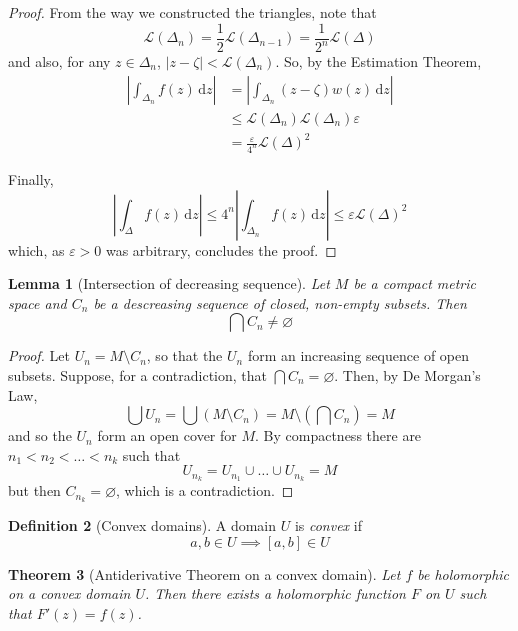 \documentclass[10pt,fleqn]{article}
\newcommand{\diff}{\,\mathrm{d}}
\newcommand{\eps}{\varepsilon}
\theoremstyle{definition} \newtheorem{defn}{Definition}[section]
\theoremstyle{plain}      \newtheorem{thm}[defn]{Theorem}
\theoremstyle{definition} \newtheorem{prop}[defn]{Proposition}
\theoremstyle{plain}      \newtheorem{lem}[defn]{Lemma}
\theoremstyle{definition} \newtheorem{cor}[defn]{Corollary}
\theoremstyle{definition} \newtheorem{ex}[defn]{Example}
\theoremstyle{definition} \newtheorem{rem}[defn]{Remark}
\begin{document}
\begin{proof}
    From the way we constructed the triangles, note that
    \[
        \mathcal{L}(\Delta_n)=
        \frac{1}{2}\mathcal{L}(\Delta_{n-1})=
        \frac{1}{2^n}\mathcal{L}(\Delta)
    \]
    and also, for any $z\in\Delta_n$, $|z-\zeta|<\mathcal{L}(\Delta_n)$.
    So, by the Estimation Theorem,
    \begin{align*}
        \left|\int_{\Delta_n} f(z)\diff z\right|
        &=
        \left|\int_{\Delta_n} (z-\zeta)w(z)\diff z \right|\\
        &\leq
        \mathcal{L}(\Delta_n)\mathcal{L}(\Delta_n)\eps\\
        &=
        \frac{\eps}{4^n}\mathcal{L}(\Delta)^2
    \end{align*}

    Finally,
    \[
        \left|\int_{\Delta} f(z)\diff z\right|\leq
        4^n\left|\int_{\Delta_n} f(z)\diff z\right|\leq
        \eps\mathcal{L}(\Delta)^2
    \]
    which, as $\eps>0$ was arbitrary, concludes the proof.
\end{proof}

\begin{lem}[Intersection of decreasing sequence]
    Let $M$ be a compact metric space and $C_n$ be a descreasing sequence of closed, non-empty subsets.
    Then
    \[
        \bigcap C_n\neq\varnothing
    \]
\end{lem}

\begin{proof}
    Let $U_n=M\setminus C_n$, so that the $U_n$ form an increasing sequence of open subsets.
    Suppose, for a contradiction, that $\bigcap C_n=\varnothing$.
    Then, by De Morgan's Law,
    \[
        \bigcup U_n=
        \bigcup (M\setminus C_n)=
        M\setminus\left(\bigcap C_n\right)=
        M
    \]
    and so the $U_n$ form an open cover for $M$.
    By compactness there are $n_1<n_2<\ldots<n_k$ such that
    \[
        U_{n_k}=
        U_{n_1}\cup\ldots\cup U_{n_k}=
        M
    \]
    but then $C_{n_k}=\varnothing$, which is a contradiction.
\end{proof}

\begin{defn}[Convex domains]
    A domain $U$ is \emph{convex} if
    \[
        a,b\in U\implies
        [a,b]\in U
    \]
\end{defn}

\begin{thm}[Antiderivative Theorem on a convex domain]
    Let $f$ be holomorphic on a convex domain $U$.
    Then there exists a holomorphic function $F$ on $U$ such that $F'(z)=f(z)$.
\end{thm}
\end{document}
